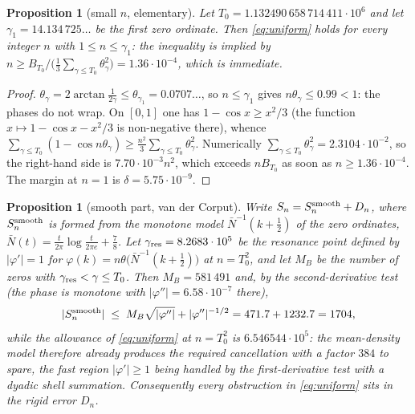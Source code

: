 \documentclass[11pt]{article}
\newtheorem{proposition}[theorem]{Proposition}
\theoremstyle{remark}
\begin{document}
\begin{proposition}[small $n$, elementary]\label{prop:small}
Let $T_0=1.132490\,658\,714\,411\cdot10^{6}$ and let $\gamma_1=14.134\,725\ldots$ be the first
zero ordinate. Then \eqref{eq:uniform} holds for every integer $n$ with $1\le n\le\gamma_1$:
the inequality is implied by $n\ge B_{T_0}\big/\bigl(\tfrac13\sum_{\gamma\le T_0}\theta_\gamma^{2}\bigr)
=1.36\cdot10^{-4}$, which is immediate.
\end{proposition}
\begin{proof}
$\theta_\gamma=2\arctan\frac1{2\gamma}\le\theta_{\gamma_1}=0.0707\ldots$, so $n\le\gamma_1$ gives
$n\theta_\gamma\le0.99<1$: the phases do not wrap. On $[0,1]$ one has $1-\cos x\ge x^{2}/3$
(the function $x\mapsto1-\cos x-x^{2}/3$ is non-negative there), whence
$\sum_{\gamma\le T_0}(1-\cos n\theta_\gamma)\ge\tfrac{n^{2}}{3}\sum_{\gamma\le T_0}\theta_\gamma^{2}$.
Numerically $\sum_{\gamma\le T_0}\theta_\gamma^{2}=2.3104\cdot10^{-2}$, so the right-hand side is
$7.70\cdot10^{-3}n^{2}$, which exceeds $nB_{T_0}$ as soon as $n\ge1.36\cdot10^{-4}$. The margin at
$n=1$ is $\delta=5.75\cdot10^{-9}$.
\end{proof}

\begin{proposition}[smooth part, van der Corput]\label{prop:smooth}
Write $S_n=S_n^{\rm smooth}+D_n$, where $S_n^{\rm smooth}$ is formed from the monotone model
$\bar N^{-1}(k+\tfrac12)$ of the zero ordinates, $\bar N(t)=\frac{t}{2\pi}\log\frac{t}{2\pi e}+\frac78$.
Let $\gamma_{\rm res}=8.2683\cdot10^{5}$ be the resonance point defined by $|\varphi'|=1$ for
$\varphi(k)=n\theta\bigl(\bar N^{-1}(k+\tfrac12)\bigr)$ at $n=T_0^{2}$, and let $M_B$ be the number of
zeros with $\gamma_{\rm res}<\gamma\le T_0$. Then $M_B=581\,491$ and, by the second-derivative test
(the phase is monotone with $|\varphi''|=6.58\cdot10^{-7}$ there),
\[
  |S_n^{\rm smooth}|\;\le\;M_B\sqrt{|\varphi''|}+|\varphi''|^{-1/2}=471.7+1232.7=1704,
\]
while the allowance of \eqref{eq:uniform} at $n=T_0^{2}$ is $6.546544\cdot10^{5}$: the mean-density
model therefore already produces the required cancellation with a factor $384$ to spare, the fast
region $|\varphi'|\ge1$ being handled by the first-derivative test with a dyadic shell summation.
Consequently every obstruction in \eqref{eq:uniform} sits in the rigid error $D_n$.
\end{proposition}
\end{document}

